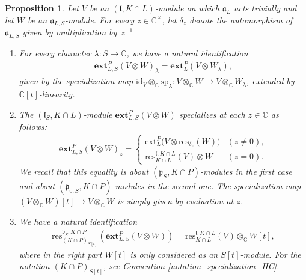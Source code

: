 \documentclass{amsart}
\newtheorem{proposition}[theorem]{Proposition}
\theoremstyle{definition}
\begin{document}
\begin{proposition}\label{specializations_ext} Let $V$ be an $(\mathfrak{l}, K\cap L)$-module on which $\mathfrak{a}_{L}$ acts trivially and let $W$ be an $\mathfrak{a}_{L,S}$-module. For every $z \in \mathbb{C}^\times$, let $\delta_z$ denote the automorphism of $\mathfrak{a}_{L,S}$ given by multiplication by~$z^{-1}$
    \begin{enumerate}
        \item For every character $\lambda : S \to \mathbb{C}$, we have a natural identification
        \begin{gather*}
            \mathbf{ext}_{L,S}^P(V \otimes W)_\lambda = \mathbf{ext}_{L}^P(V \otimes W_\lambda),
        \end{gather*}
        given by the specialization map $\mathrm{id}_V \otimes_\mathbb{C} \mathrm{sp}_\lambda : V \otimes_\mathbb{C} W \to V \otimes_\mathbb{C} W_\lambda$, extended by $\mathbb{C}[t]$-linearity.
        \item The $(\bm{\mathfrak{l}}_S,K\cap L)$-module $\mathbf{ext}_{L,S}^P(V\otimes W)$ specializes at each $z \in \mathbb{C}$ as follows:
        \begin{gather*}
            \mathbf{ext}_{L,S}^P(V\otimes W)_z = \begin{cases}
                \mathrm{ext}_L^P\big(V \otimes \mathrm{res}_{\delta_z}(W)\big) &(z\neq 0), \\
                \mathrm{res}_{K\cap L}^{\mathfrak{l}, K\cap L}(V) \otimes W & (z = 0).
            \end{cases}
        \end{gather*}
        We recall that this equality is about $(\mathfrak{p}_S, K\cap P)$-modules in the first case and about $(\mathfrak{p}_{0,S}, K\cap P)$-modules in the second one. The specialization map $(V \otimes_\mathbb{C} W)[t] \to V \otimes_\mathbb{C} W$ is simply given by evaluation at $z$.
        \item We have a natural identification
        \begin{gather*}
            \mathrm{res}_{(K\cap P)_{S[t]}}^{\bm{\mathfrak{p}}_S, K\cap P}\left(\mathbf{ext}_{L,S}^P(V \otimes W) \right) = \mathrm{res}_{K\cap L}^{\mathfrak{l}, K\cap L}(V) \otimes_{\mathbb{C}} W[t],
        \end{gather*}
        where in the right part $W[t]$ is only considered as an $S[t]$-module. For the notation $(K\cap P)_{S[t]}$, see Convention \ref{notation_specialization_HC}.
    \end{enumerate}
\end{proposition}
\end{document}
